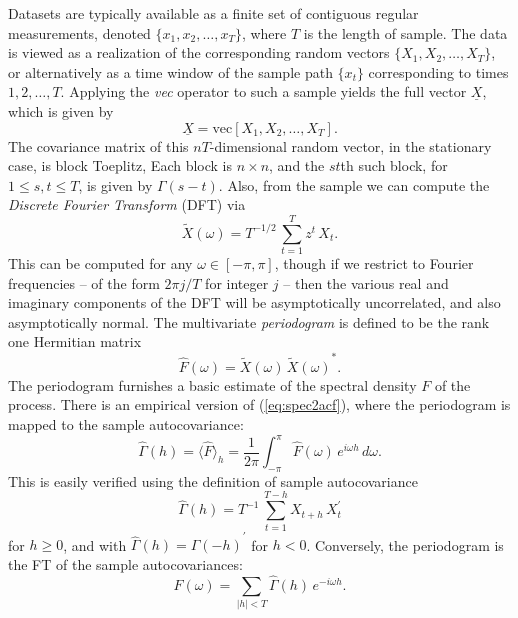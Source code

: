 \documentclass[a4paper]{book}
\begin{document}
 Datasets are typically available as a finite set of contiguous regular
 measurements, denoted $\{ x_1, x_2, \ldots, x_T \}$, where $T$ is 
 the length of sample.  The data is viewed as a realization of the 
 corresponding random vectors $\{ X_1, X_2, \ldots, X_T \}$, or alternatively
 as a time window of the sample path $\{ x_t \}$ corresponding to times
 $1, 2, \ldots, T$.  Applying the {\em vec} operator to such a sample
 yields the full vector $\underline{X}$, which is given by
\[
 \underline{X} = \mbox{vec} [ X_1, X_2, \ldots, X_T ].
\]
 The covariance matrix of this $nT$-dimensional random vector, in the
 stationary case, is block Toeplitz,   Each block is $n \times n$, and
 the $st$th such block, for $1 \leq s,t \leq T$, is given by $\Gamma (s-t)$.
 Also, from the sample we can compute the {\em Discrete Fourier Transform} (DFT)
  via
\begin{equation}
\label{eq:dft-def}
    \widetilde{X} (\omega) = T^{-1/2} \, \sum_{t=1}^T z^t \, X_t.
\end{equation}
 This can be computed for any $\omega \in [-\pi, \pi]$, though if we restrict
 to Fourier frequencies -- of the form
 $2 \pi j/T$ for integer $j$ -- then the various real and imaginary 
components of the DFT will be asymptotically uncorrelated, and
 also asymptotically normal.   The multivariate {\em periodogram}
  is defined to   be the rank one Hermitian matrix
\begin{equation}
\label{eq:per-def}
  \widehat{F} (\omega) = \widetilde{X} (\omega) \, { \widetilde{X} (\omega) }^*.
\end{equation}
  The periodogram furnishes a basic estimate of the spectral density $F$ of the process.
  There is an empirical version of (\ref{eq:spec2acf}), where the periodogram is mapped to the sample 
 autocovariance:
\begin{equation}
 \label{eq:per2acf}
  \widehat{\Gamma} (h) = { \langle \widehat{F}  \rangle }_h
  =  \frac{1}{2 \pi} \int_{-\pi}^{\pi} \widehat{F}(\omega) \, e^{i \omega h}
  \, d\omega.
\end{equation}
   This is easily verified using the definition of sample autocovariance
\[
   \widehat{\Gamma} (h) = T^{-1} \, \sum_{t=1}^{T-h}
   X_{t+h} \, X_t^{\prime}
\]
 for $h \geq 0$, and with $\widehat{\Gamma} (h) = { \widehat{\Gamma} (-h) }^{\prime}$ for $h < 0$.
  Conversely, the periodogram is the FT of the sample autocovariances:
\begin{equation}
 \label{eq:acf2per}
   \widehat{F} (\omega) = \sum_{|h| < T} \widehat{\Gamma} (h) \, e^{-i   \omega h}.
\end{equation}
\end{document}
